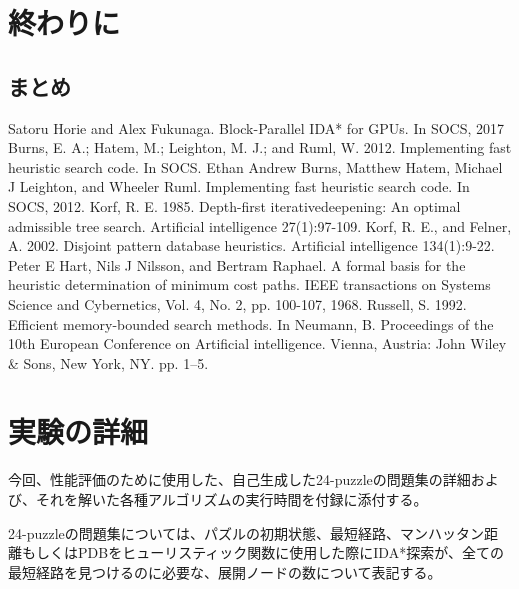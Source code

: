 \documentclass[a4paper,11pt,oneside,openany]{jsbook}
\begin{document}
\chapter{終わりに}
\section{まとめ}



\begin{thebibliography}{10}
   Satoru Horie and Alex Fukunaga. Block-Parallel IDA* for GPUs. In SOCS, 2017 
   Burns, E. A.; Hatem, M.; Leighton,  M. J.; and Ruml, W. 2012. Implementing fast heuristic search code. In SOCS.
  Ethan Andrew Burns, Matthew Hatem, Michael J Leighton, and Wheeler Ruml. Implementing fast heuristic search code. In SOCS, 2012.
  Korf, R. E. 1985. Depth-first iterativedeepening: An optimal admissible tree search. Artificial intelligence 27(1):97-109.
  Korf, R. E., and Felner, A. 2002. Disjoint pattern database heuristics. Artificial intelligence 134(1):9-22.
  Peter E Hart, Nils J Nilsson, and Bertram Raphael. A formal basis for the heuristic determination of minimum cost paths. IEEE transactions on Systems Science and Cybernetics, Vol. 4, No. 2, pp. 100-107, 1968. 
  Russell, S. 1992. Efficient memory-bounded search methods. In Neumann, B. Proceedings of the 10th European Conference on Artificial intelligence. Vienna, Austria: John Wiley \& Sons, New York, NY. pp. 1–5.

\end{thebibliography}

\appendix
\chapter{実験の詳細}
今回、性能評価のために使用した、自己生成した24-puzzleの問題集の詳細および、それを解いた各種アルゴリズムの実行時間を付録に添付する。

24-puzzleの問題集については、パズルの初期状態、最短経路、マンハッタン距離もしくはPDBをヒューリスティック関数に使用した際にIDA*探索が、全ての最短経路を見つけるのに必要な、展開ノードの数について表記する。
\end{document}
